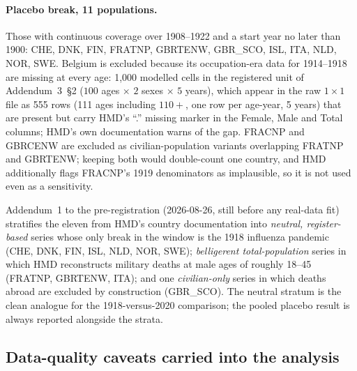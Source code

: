 \paragraph{Placebo break, 11 populations.} Those with continuous coverage
over 1908--1922 and a start year no later than 1900: CHE, DNK, FIN, FRATNP,
GBRTENW, GBR\_SCO, ISL, ITA, NLD, NOR, SWE. Belgium is excluded because its
occupation-era data for 1914--1918 are missing at every age: 1{,}000
modelled cells in the registered unit of Addendum~3~\S2 ($100$ ages
$\times$ $2$ sexes $\times$ $5$ years), which appear in the raw $1\times1$
file as 555 rows (111 ages including $110{+}$, one row per age-year, 5
years) that are present but carry HMD's ``.'' missing marker in the Female,
Male and Total columns; HMD's own documentation warns of the gap. FRACNP and GBRCENW are excluded as
civilian-population variants overlapping FRATNP and GBRTENW; keeping both
would double-count one country, and HMD additionally flags FRACNP's 1919
denominators as implausible, so it is not used even as a sensitivity.

Addendum~1 to the pre-registration (2026-08-26, still before any real-data
fit) stratifies the eleven from HMD's country documentation into
\emph{neutral, register-based} series whose only break in the window is the
1918 influenza pandemic (CHE, DNK, FIN, ISL, NLD, NOR, SWE);
\emph{belligerent total-population} series in which HMD reconstructs
military deaths at male ages of roughly 18--45 (FRATNP, GBRTENW, ITA); and one
\emph{civilian-only} series in which deaths abroad are excluded by
construction (GBR\_SCO). The neutral stratum is the clean analogue for the
1918-versus-2020 comparison; the pooled placebo result is always reported
alongside the strata.

\begin{table}[htbp]\centering
\caption{Populations by regime: first and last year of single-age data in
the pinned vintage, training years available at the shift origin,
zero-exposure cells at ages $0$--$99$, and zero-death test cells
($D<\tfrac12$) per sex in the shift window. Generated from the data files,
not from any model output.}
\label{tab:populations}
\end{table}

\subsection{Data-quality caveats carried into the analysis}

